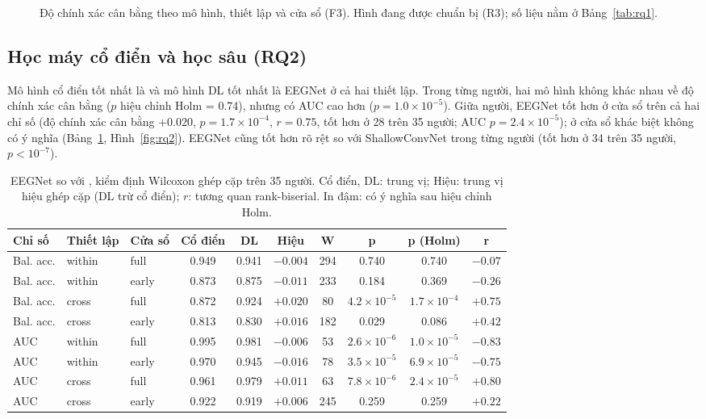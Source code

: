\begin{figure}[H]
\centering
{}
\caption{Độ chính xác cân bằng theo mô hình, thiết lập và cửa sổ (F3). Hình đang được chuẩn bị (R3); số liệu nằm ở Bảng~\ref{tab:rq1}.}
\label{fig:rq1}
\end{figure}

\subsection{Học máy cổ điển và học sâu (RQ2)}
\label{sec:res-rq2}
Mô hình cổ điển tốt nhất là  và mô hình DL tốt nhất là EEGNet ở cả hai thiết lập. Trong từng người, hai mô hình không khác nhau về độ chính xác cân bằng ($p$ hiệu chỉnh Holm = 0.74), nhưng  có AUC cao hơn ($p = 1.0 \times 10^{-5}$). Giữa người, EEGNet tốt hơn ở cửa sổ  trên cả hai chỉ số (độ chính xác cân bằng $+0.020$, $p = 1.7 \times 10^{-4}$, $r = 0.75$, tốt hơn ở 28 trên 35 người; AUC $p = 2.4 \times 10^{-5}$); ở cửa sổ  khác biệt không có ý nghĩa (Bảng~\ref{tab:rq2}, Hình~\ref{fig:rq2}). EEGNet cũng tốt hơn rõ rệt so với ShallowConvNet trong từng người (tốt hơn ở 34 trên 35 người, $p < 10^{-7}$).

\begin{table}[H]
\centering
\footnotesize
\caption{EEGNet so với , kiểm định Wilcoxon ghép cặp trên 35 người. Cổ điển, DL: trung vị; Hiệu: trung vị hiệu ghép cặp (DL trừ cổ điển); $r$: tương quan rank-biserial. In đậm: có ý nghĩa sau hiệu chỉnh Holm.}
\label{tab:rq2}
\setlength{\tabcolsep}{3pt}
\begin{tabular}{lllccccccc}
\toprule
\textbf{Chỉ số} & \textbf{Thiết lập} & \textbf{Cửa sổ} & \textbf{Cổ điển} & \textbf{DL} & \textbf{Hiệu} & \textbf{W} & \textbf{p} & \textbf{p (Holm)} & \textbf{r} \\
\midrule
Bal. acc. & within & full & 0.949 & 0.941 & $-0.004$ & 294 & 0.740 & 0.740 & $-0.07$ \\
Bal. acc. & within & early & 0.873 & 0.875 & $-0.011$ & 233 & 0.184 & 0.369 & $-0.26$ \\
Bal. acc. & cross & full & 0.872 & 0.924 & $+0.020$ & 80 & $4.2 \times 10^{-5}$ & {\boldmath$1.7 \times 10^{-4}$} & $+0.75$ \\
Bal. acc. & cross & early & 0.813 & 0.830 & $+0.016$ & 182 & 0.029 & 0.086 & $+0.42$ \\
\midrule
AUC & within & full & 0.995 & 0.981 & $-0.006$ & 53 & $2.6 \times 10^{-6}$ & {\boldmath$1.0 \times 10^{-5}$} & $-0.83$ \\
AUC & within & early & 0.970 & 0.945 & $-0.016$ & 78 & $3.5 \times 10^{-5}$ & {\boldmath$6.9 \times 10^{-5}$} & $-0.75$ \\
AUC & cross & full & 0.961 & 0.979 & $+0.011$ & 63 & $7.8 \times 10^{-6}$ & {\boldmath$2.4 \times 10^{-5}$} & $+0.80$ \\
AUC & cross & early & 0.922 & 0.919 & $+0.006$ & 245 & 0.259 & 0.259 & $+0.22$ \\
\bottomrule
\end{tabular}
\end{table}

